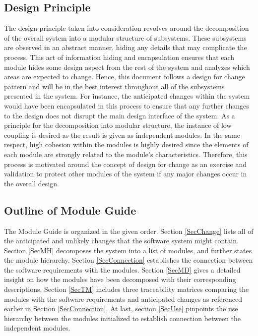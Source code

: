 \documentclass{article}
\begin{document}
\subsection{Design Principle}
The design principle taken into consideration revolves around the decomposition of the overall system into a modular structure of subsystems. These subsystems are observed in an abstract manner, hiding any details that may complicate the process. This act of information hiding and encapsulation ensures that each module hides some design aspect from the rest of the system and analyzes which areas are expected to change. Hence, this document follows a design for change pattern and will be in the best interest throughout all of the subsystems presented in the system. For instance, the anticipated changes within the system would have been encapsulated in this process to ensure that any further changes to the design does not disrupt the main design interface of the system. As a principle for the decomposition into modular structure, the instance of low coupling is desired as the result is given as independent modules. In the same respect, high cohesion within the modules is highly desired since the elements of each module are strongly related to the module's characteristics. Therefore, this process is motivated around the concept of design for change as an exercise and validation to protect other modules of the system if any major changes occur in the overall design.

\subsection{Outline of Module Guide}
The Module Guide is organized in the given order. Section \ref{SecChange} lists all of the anticipated and unlikely changes that the software system might contain. Section \ref{SecMH} decomposes the system into a list of modules, and further states the module hierarchy. Section \ref{SecConnection} establishes the connection between the software requirements with the modules. Section \ref{SecMD} gives a detailed insight on how the modules have been decomposed with their corresponding descriptions. Section \ref{SecTM} includes three traceability matrices comparing the modules with the software requirements and anticipated changes as referenced earlier in Section \ref{SecConnection}. At last, section \ref{SecUse} pinpoints the use hierarchy between the modules initialized to establish connection between the independent modules.
\end{document}
